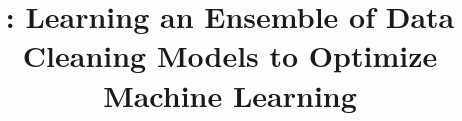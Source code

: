 \documentclass{sig-alternate}
\begin{document}
\newcommand{\reminder}[1]{{{\textcolor{magenta}{\{\{\bf #1\}\}}}\xspace}}
\newcommand{\ewu}[1]{{{\textcolor{blue}{\{\{\bf ewu:\} #1\}}}\xspace}}
\newcommand{\mps}[1]{{{\textcolor{red}{\{\{\bf meelap:\} #1\}}}\xspace}}

\newcommand{\blue}[1]{{\textcolor{blue}{{\bf #1}}\xspace}}
\newcommand{\orange}[1]{{\textcolor{orange}{{\bf #1}}\xspace}}



\newcommand{\specialcell}[2][c]{%
  \begin{tabular}[#1]{@{}c@{}}#2\end{tabular}}

\def\ojoin{\setbox0=\hbox{$\bowtie$}%
  \rule[-.02ex]{.25em}{.4pt}\llap{\rule[\ht0]{.25em}{.4pt}}}
\def\leftouterjoin{\mathbin{\ojoin\mkern-5.8mu\bowtie}}
\def\rightouterjoin{\mathbin{\bowtie\mkern-5.8mu\ojoin}}
\def\fullouterjoin{\mathbin{\ojoin\mkern-5.8mu\bowtie\mkern-5.8mu\ojoin}}


\pagestyle{plain}

%

\title{\sys: Learning an Ensemble of Data Cleaning Models to Optimize Machine Learning}




\maketitle
\end{document}
